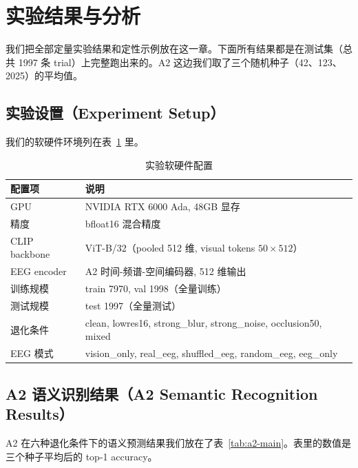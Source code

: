 \section{实验结果与分析}

我们把全部定量实验结果和定性示例放在这一章。下面所有结果都是在测试集（总共 1997 条 trial）上完整跑出来的。A2 这边我们取了三个随机种子（42、123、2025）的平均值。

\subsection{实验设置（Experiment Setup）}

我们的软硬件环境列在表~\ref{tab:exp-setup} 里。

\begin{table}[htbp]
  \centering
  \caption{实验软硬件配置}
  \label{tab:exp-setup}
  \begin{tabular}{l l}
    \toprule
    配置项 & 说明 \\
    \midrule
    GPU & NVIDIA RTX 6000 Ada, 48GB 显存 \\
    精度 & bfloat16 混合精度 \\
    CLIP backbone & ViT-B/32（pooled 512 维, visual tokens $50\times512$）\\
    EEG encoder & A2 时间-频谱-空间编码器, 512 维输出 \\
    训练规模 & train 7970, val 1998（全量训练）\\
    测试规模 & test 1997（全量测试）\\
    退化条件 & clean, lowres16, strong\_blur, strong\_noise, occlusion50, mixed \\
    EEG 模式 & vision\_only, real\_eeg, shuffled\_eeg, random\_eeg, eeg\_only \\
    \bottomrule
  \end{tabular}
\end{table}

\subsection{A2 语义识别结果（A2 Semantic Recognition Results）}

A2 在六种退化条件下的语义预测结果我们放在了表~\ref{tab:a2-main}。表里的数值是三个种子平均后的 top-1 accuracy。

